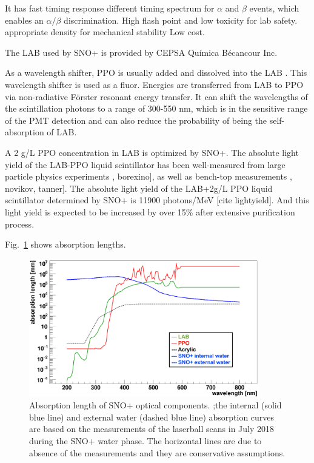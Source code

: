 It has fast timing response different timing spectrum for $\alpha$ and $\beta$ events, which enables an $\alpha/\beta$ discrimination. 
High flash point and low toxicity for lab safety.
 appropriate density for mechanical stability
 Low cost.


The LAB used by SNO+ is provided by CEPSA Qu\'{i}mica B\'ecancour Inc.





As a wavelength shifter, PPO is usually added and dissolved into the LAB \cite{wunderly1990new}. This wavelength shifter is used as a fluor. Energies are transferred from LAB to PPO via non-radiative F{\"o}rster resonant energy transfer. It can shift the wavelengths of the scintillation photons to a range of 300-550 nm, which is in the sensitive range of the PMT detection and can also reduce the probability of being the self-absorption of LAB.

A 2 g/L PPO concentration in LAB is optimized by SNO+\cite{whitepaper}. The absolute light yield of the LAB-PPO liquid scintillator has been well-measured from large particle physics experiments \cite{xing2015preliminary}, borexino], as well as bench-top measurements \cite{xing2015preliminary}, novikov, tanner]. The absolute light yield of the LAB+2g/L PPO liquid scintillator determined by SNO+ is 11900 photons/MeV [cite lightyield]. And this light yield is expected to be increased by over 15\% after extensive purification process\cite{snop_jinst}. 


Fig.~\ref{absLength} shows absorption lengths.

\begin{figure}[!htb]
	\centering
	\includegraphics[width=10cm]{absLength.png}
	\caption{Absorption length of SNO+ optical components. ;the internal (solid blue line) and external water (dashed blue line) absorption curves are based on the measurements of the laserball scans in July 2018 during the SNO+ water phase. The horizontal lines are due to absence of the measurements and they are conservative assumptions.}
	\label{absLength}
\end{figure}

